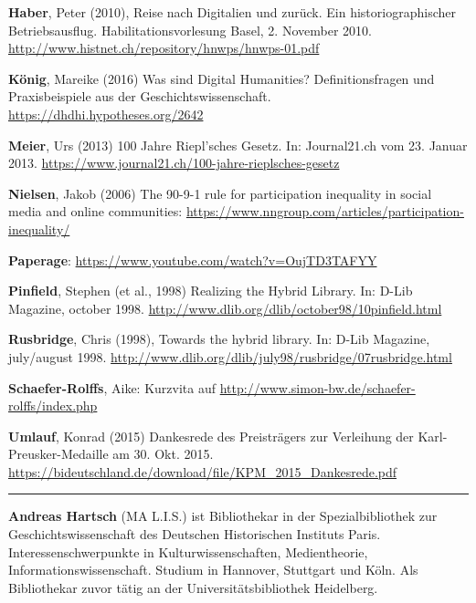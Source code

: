 \documentclass[a4paper,
fontsize=11pt,
oneside,
numbers=noperiodatend,
parskip=half-,
bibliography=totoc,
final
]{scrartcl}
\begin{document}
\textbf{Haber}, Peter (2010), Reise nach Digitalien und zurück. Ein
historiographischer Betriebsausflug. Habilitationsvorlesung Basel, 2.
November 2010. \url{http://www.histnet.ch/repository/hnwps/hnwps-01.pdf}

\textbf{König}, Mareike (2016) Was sind Digital Humanities?
Definitionsfragen und Praxisbeispiele aus der Geschichtswissenschaft.
\url{https://dhdhi.hypotheses.org/2642}

\textbf{Meier}, Urs (2013) 100 Jahre Riepl'sches Gesetz. In:
Journal21.ch vom 23. Januar 2013.
\url{https://www.journal21.ch/100-jahre-rieplsches-gesetz}

\textbf{Nielsen}, Jakob (2006) The 90-9-1 rule for participation
inequality in social media and online communities:
\url{https://www.nngroup.com/articles/participation-inequality/}

\textbf{Paperage}: \url{https://www.youtube.com/watch?v=OujTD3TAFYY}

\textbf{Pinfield}, Stephen (et al., 1998) Realizing the Hybrid Library.
In: D-Lib Magazine, october 1998.
\url{http://www.dlib.org/dlib/october98/10pinfield.html}

\textbf{Rusbridge}, Chris (1998), Towards the hybrid library. In: D-Lib
Magazine, july/august 1998.
\url{http://www.dlib.org/dlib/july98/rusbridge/07rusbridge.html}

\textbf{Schaefer-Rolffs}, Aike: Kurzvita auf
\url{http://www.simon-bw.de/schaefer-rolffs/index.php}

\textbf{Umlauf}, Konrad (2015) Dankesrede des Preisträgers zur
Verleihung der Karl-Preusker-Medaille am 30. Okt. 2015.
\url{https://bideutschland.de/download/file/KPM_2015_Dankesrede.pdf}

\begin{center}\rule{0.5\linewidth}{\linethickness}\end{center}

\textbf{Andreas Hartsch} (MA L.I.S.) ist Bibliothekar in der
Spezialbibliothek zur Geschichtswissenschaft des Deutschen Historischen
Instituts Paris. Interessenschwerpunkte in Kulturwissenschaften,
Medientheorie, Informationswissenschaft. Studium in Hannover, Stuttgart
und Köln. Als Bibliothekar zuvor tätig an der Universitätsbibliothek
Heidelberg.
\end{document}
